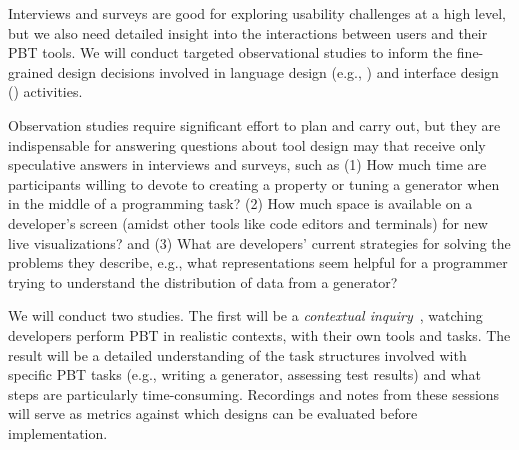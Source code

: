 %
Interviews and surveys are good for exploring usability challenges
at a high level, but we also need detailed insight into the interactions
between users and their PBT tools.  We will
conduct targeted observational studies to inform the
fine-grained design decisions
involved in language design (e.g.,
) and
interface design () activities.

Observation studies require significant effort to plan and
carry out, but they
are indispensable for answering questions about tool design may that
receive only
speculative answers in interviews and surveys, such as
(1) How much time
are participants willing to devote to
creating a property or tuning a generator when in the
middle of a programming task?
(2) How much space is available on a developer's
screen (amidst other tools like code editors and terminals) for
new live
visualizations? and
(3) What are developers' current strategies for solving the
problems they describe, e.g., what representations
seem helpful
for a programmer trying to understand the distribution of data from a
generator?

We will conduct two studies. The first will be a
{\em contextual inquiry}~\cite[Chapter
3]{ref:holtzblatt1997contextual}, watching
developers perform PBT in realistic contexts, with their own tools and tasks.
The result will be a detailed understanding of the task
structures involved with specific PBT tasks (e.g., writing a generator,
assessing test results) and what steps are
particularly time-consuming.  Recordings and notes from
these sessions will serve as metrics against which designs
can be evaluated before implementation.

